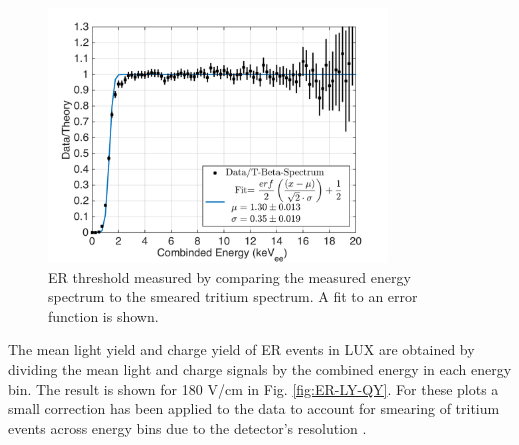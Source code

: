 \begin{figure}[h!]\centering
\includegraphics[width=90mm]{fig/E_Thres_Fit.png}
\caption{ER threshold measured by comparing the measured energy spectrum to the smeared tritium spectrum. A fit to an error function is shown.}
\label{fig:ER-threshold}
\end{figure}

The mean light yield and charge yield of ER events in LUX are obtained by dividing the mean light and charge signals by the combined energy in each energy bin. The result is shown for 180 V/cm in Fig. \ref{fig:ER-LY-QY}. For these plots a small correction has been applied to the data to account for smearing of tritium events across energy bins due to the detector's resolution \cite{Dobi_Thesis}. 

